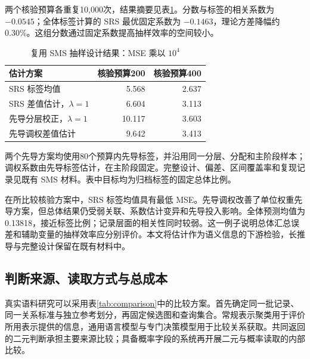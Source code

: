 \documentclass[UTF8,a4paper,zihao=-4,fontset=fandol]{ctexart}
\begin{document}
两个核验预算各重复10,000次，结果摘要见表\ref{tab:sms}。分数与标签的相关系数为 $-0.0545$；全体标签计算的 SRS 最优固定系数为 $-0.1463$，理论方差降幅约0.30\%。这组分数通过固定系数提高抽样效率的空间较小。

\begin{table}[htbp]
\centering\small
\caption{复用 SMS 抽样设计结果：MSE 乘以 $10^4$}\label{tab:sms}
\begin{tabular}{@{}lrr@{}}
\toprule
估计方案 & 核验预算200 & 核验预算400 \\
\midrule
SRS 标签均值 & 5.568 & 2.637 \\
SRS 差值估计，$\lambda=1$ & 6.604 & 3.113 \\
先导分层校正，$\lambda=1$ & 10.117 & 3.603 \\
先导调权差值估计 & 9.642 & 3.413 \\
\bottomrule
\end{tabular}
\vspace{0.3em}
\parbox{\textwidth}{\footnotesize 两个先导方案均使用80个预算内先导标签，并沿用同一分层、分配和主阶段样本；调权系数由先导标签估计，在主阶段固定。完整设计、偏差、区间覆盖率和复现记录见既有 SMS 材料。表中目标均为归档标签的固定总体比例。}
\end{table}

在所比较核验方案中，SRS 标签均值具有最低 MSE。先导调权改善了单位权重先导方案，但总体结果仍受弱关联、系数估计变异和先导投入影响。全体预测均值为0.13818，接近标签比例；记录层面的相关性同时较弱。这一例子说明总体汇总误差和辅助变量的抽样效率应分别评价。本文将估计作为语义信息的下游检验，长推导与完整设计保留在既有材料中。

\subsection{判断来源、读取方式与总成本}\label{sec:agenda}

真实语料研究可以采用表\ref{tab:comparison}中的比较方案。首先确定同一批记录、同一关系标准与独立参考划分，再固定候选图和查询集合。常规表示聚类用于评价所用表示提供的信息，通用语言模型与专门决策模型用于比较关系获取。共同返回的二元判断承担主要来源比较；具备概率字段的系统再开展二元与概率读取的内部比较。
\end{document}
